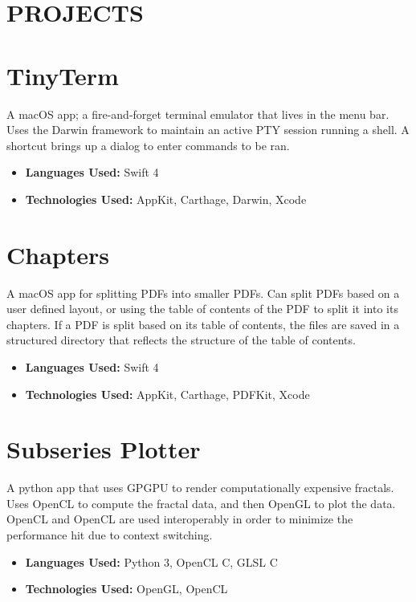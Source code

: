 \documentclass[margin]{../res}
\begin{document}
  

\address{Email: raphaelreyna@protonmail.com \\
  Phone: (626) 384-1342\\
  Site: www.raphaelreyna.works}
                           
                        
\begin{resume} 
\section{PROJECTS}
  
\normalsize{\section{TinyTerm}}
A macOS app; a fire-and-forget terminal emulator that lives in the menu bar.
Uses the Darwin framework to maintain an active PTY session running a shell.
A shortcut brings up a dialog to enter commands to be ran.
\begin{itemize}
\item {\bf Languages Used: } Swift 4 
\item {\bf Technologies Used: } AppKit, Carthage, Darwin, Xcode
\end{itemize}

\normalsize{\section{Chapters}}
A macOS app for splitting PDFs into smaller PDFs.
Can split PDFs based on a user defined layout, or using the
table of contents of the PDF to split it into its chapters.
If a PDF is split based on its table of contents, the files are saved in a
structured directory that reflects the structure of the table of contents.
\begin{itemize}
\item{ \bf Languages Used: } Swift 4 
\item { \bf Technologies Used: } AppKit, Carthage, PDFKit, Xcode
\end{itemize}

\normalsize{\section{Subseries Plotter}}
A python app that uses GPGPU to render computationally expensive
fractals.
Uses OpenCL to compute the fractal data, and then OpenGL to plot the data.
OpenCL and OpenCL are used interoperably in order to minimize the performance hit due to context switching.
\begin{itemize}
\item {\bf Languages Used: } Python 3, OpenCL C, GLSL C
\item {\bf Technologies Used: } OpenGL, OpenCL
\end{itemize}


\end{resume}
\end{document}
